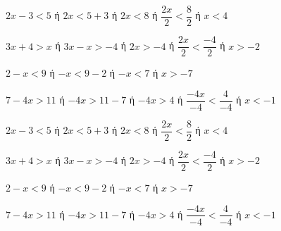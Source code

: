 \begin{alist}
\item $ 2x-3<5 $ ή $ 2x<5+3 $ ή $ 2x<8 $ ή $ \dfrac{2x}{2}<\dfrac{8}{2} $ ή $ x<4 $
\item $ 3x+4>x $ ή $ 3x-x>-4 $ ή $ 2x>-4 $ ή $ \dfrac{2x}{2}<\dfrac{-4}{2} $ ή $ x>-2 $
\item $ 2-x<9 $ ή $ -x<9-2 $ ή $ -x<7 $ ή $ x>-7 $
\item $ 7-4x>11 $ ή $ -4x>11-7 $ ή $ -4x>4 $ ή $ \dfrac{-4x}{-4}<\dfrac{4}{-4} $ ή $ x<-1 $
\end{alist}
\begin{alist}
\item $ 2x-3<5 $ ή $ 2x<5+3 $ ή $ 2x<8 $ ή $ \dfrac{2x}{2}<\dfrac{8}{2} $ ή $ x<4 $
\item $ 3x+4>x $ ή $ 3x-x>-4 $ ή $ 2x>-4 $ ή $ \dfrac{2x}{2}<\dfrac{-4}{2} $ ή $ x>-2 $
\item $ 2-x<9 $ ή $ -x<9-2 $ ή $ -x<7 $ ή $ x>-7 $
\item $ 7-4x>11 $ ή $ -4x>11-7 $ ή $ -4x>4 $ ή $ \dfrac{-4x}{-4}<\dfrac{4}{-4} $ ή $ x<-1 $
\end{alist}
